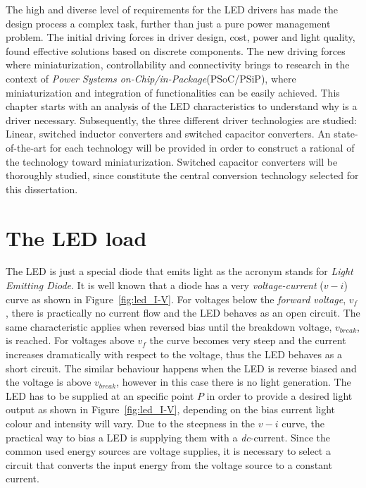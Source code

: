 The high and diverse level of requirements for the LED drivers has made the design process a complex task, further than just a pure power management problem. The initial driving forces in driver design, cost, power and light quality, found effective solutions  based on discrete components.  The new driving forces where miniaturization, controllability and connectivity brings to research in the context of \emph{Power Systems on-Chip/in-Package}(PSoC/PSiP), where miniaturization and integration of functionalities can be easily achieved. This chapter starts with an analysis of the LED characteristics to understand why is a driver necessary. Subsequently, the three different driver technologies are studied: Linear, switched inductor converters and switched capacitor converters. An state-of-the-art for each technology will be provided in order to construct a rational of the technology toward miniaturization. Switched capacitor converters will be thoroughly studied, since constitute the central conversion technology selected for this dissertation.


\section{The LED load}

The LED is just a special diode that emits light as the acronym stands for \emph{Light Emitting Diode}. It is well known that a diode has a very \emph{voltage-current} ($v-i$) curve as shown in Figure~\ref{fig:led_I-V}. For voltages below the \emph{forward voltage}, $v_{f}$, there is practically no current flow and the LED behaves as an open circuit. The same characteristic applies  when reversed bias until the breakdown voltage, $v_{break}$, is reached. For voltages above $v_{f}$ the curve becomes very steep and the current increases dramatically with respect to the voltage, thus the LED behaves as a short circuit. The similar behaviour happens when the LED is reverse biased and the voltage is above $v_{break}$, however in this case there is no light generation. The LED has to be supplied at an specific point $P$ in order to provide a desired light output as shown in Figure~\ref{fig:led_I-V}, depending on the bias current light colour and intensity will vary. Due to the steepness in the $v-i$ curve, the practical way to bias a LED is supplying them with a \emph{dc}-current. Since the common used energy sources are voltage supplies, it is necessary to select a circuit that converts the input energy from the voltage source to a constant current.


